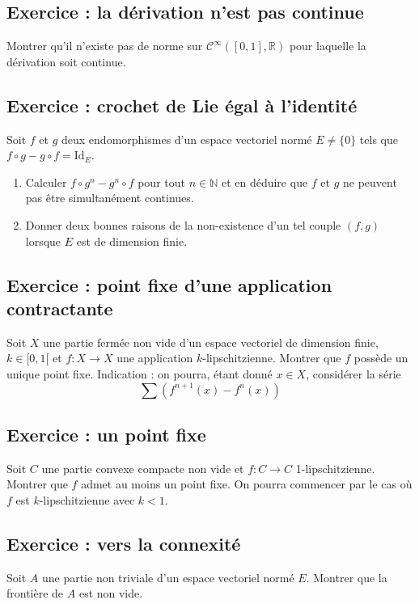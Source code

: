\documentclass[french]{book}
\newcommand{\N}{\mathbb{N}}
\newcommand{\R}{\mathbb{R}}
\begin{document}
\subsection{Exercice : la dérivation n'est pas continue}
Montrer qu'il n'existe pas de norme sur $\mathcal{C}^{\infty}([0,1],\R)$ pour laquelle la dérivation soit continue.

\subsection{Exercice : crochet de Lie égal à l'identité}
Soit $f$ et $g$ deux endomorphismes d'un espace vectoriel normé $E\ne\{0\}$ tels que $f\circ g-g\circ f=\text{Id}_E$.
\begin{enumerate}
	\item Calculer $f\circ g^n-g^n\circ f$ pour tout $n\in\N$ et en déduire que $f$ et $g$ ne peuvent pas être simultanément continues.
	\item Donner deux bonnes raisons de la non-existence d'un tel couple $(f,g)$ lorsque $E$ est de dimension finie.
\end{enumerate}

\subsection{Exercice : point fixe d'une application contractante}
Soit $X$ une partie fermée non vide d'un espace vectoriel de dimension finie, $k\in[0,1[$ et $f:X\to X$ une application $k$-lipschitzienne. Montrer que $f$ possède un unique point fixe. Indication : on pourra, étant donné $x\in X$, considérer la série $$\sum (f^{n+1}(x)-f^n(x))$$

\subsection{Exercice : un point fixe}
Soit $C$ une partie convexe compacte non vide et $f:C\to C$ 1-lipschitzienne. Montrer que $f$ admet au moins un point fixe. On pourra commencer par le cas où $f$ est $k$-lipschitzienne avec $k<1$.

\subsection{Exercice : vers la connexité}
Soit $A$ une partie non triviale d'un espace vectoriel normé $E$. Montrer que la frontière de $A$ est non vide.
\end{document}
